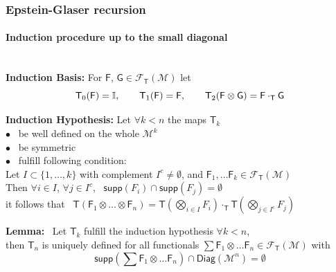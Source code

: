 \documentclass[9pt]{beamer}
\newcommand{\Tdot}{\cdot_\Tsf} %
\newcommand{\supp}{\mathsf{supp}} %
\newcommand{\Fcal}{\mathcal{F}}
\newcommand{\Mcal}{\mathcal{M}}
\newcommand{\Ibb}{\mathbb{I}}
\newcommand{\Fsf}{\mathsf{F}}
\newcommand{\Gsf}{\mathsf{G}}
\newcommand{\Tsf}{\mathsf{T}}
\begin{document}




\begin{frame}[label=proof_EG_induction]

\frametitle{Epstein-Glaser recursion}%

\framesubtitle{Induction procedure up to the small diagonal}
 \hfill \hyperlink{regul_prob}{} \\
 \vspace*{-18pt}
\textbf{Induction Basis:} For $\Fsf$, $\Gsf \in \Fcal_\Tsf(\Mcal)$ let 
\vspace*{-10pt}
\begin{equation*}
 \Tsf_0(\Fsf) = \Ibb, \qquad \Tsf_1(\Fsf) = \Fsf, \qquad
\Tsf_2(\Fsf \otimes \Gsf) = \Fsf \Tdot \Gsf 
\vspace*{-8pt}
\end{equation*}

\textbf{Induction Hypothesis:} Let $\forall k < n$ the maps $\Tsf_k$ \\
\quad $\bullet$ \ be well defined on the whole $\Mcal^k$ \\
\quad $\bullet$ \ be symmetric \\
\quad $\bullet$ \ fulfill following condition: \\
\hspace*{30pt} Let $I \subset \{ 1, \dots, k\}$ with complement $I^c \neq \emptyset$, and $\Fsf_1, \dots \Fsf_k \in \Fcal_\Tsf(\Mcal)$ \\
\hspace*{30pt} Then $\forall i \in I$, $\forall j \in I^c$, \ $\supp(F_i) \cap \supp(F_j) = \emptyset$ \\
\hspace*{30pt} it follows that \ $\Tsf(\Fsf_1 \otimes \dots \otimes \Fsf_n) = \Tsf\left( \underset{i \in I}{\bigotimes} F_i \right) \Tdot \Tsf\left( \underset{j \in I^c}{\bigotimes} F_j \right)$
\vspace{-4pt}
\begin{block}{\vspace*{-3ex}}
\vspace*{-4pt}
 \textbf{Lemma:} \
 Let $\Tsf_k$ fulfill the induction hypothesis $\forall k < n$, \\
 then $\Tsf_n$ is uniquely defined for all functionals 
 $\sum \Fsf_1 \otimes \dots \Fsf_n \in \Fcal_\Tsf(\Mcal)$ with
 \vspace*{-8pt}
 \begin{equation*}
 \supp\left( \sum \Fsf_1 \otimes \dots \Fsf_n \right) \cap \mathsf{Diag}(\Mcal^n) = \emptyset
 \end{equation*}
\vspace*{-18pt}
 \end{block}
\end{frame}
\end{document}
